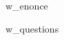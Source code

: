 \begin{exo}
    {w_enonce}
\end{exo}

\begin{enumerate}
    {
        {w_questions}
    }
\end{enumerate}